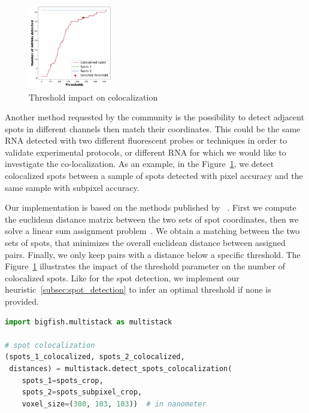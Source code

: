 \begin{figure}
	\begin{center}
		\includegraphics[width=0.33\textwidth]{figures/chapter2/colocalization_elbow}
	\caption{Threshold impact on colocalization}
	\label{fig:elbow_colocalization}
	\end{center}
\end{figure}

Another method requested by the community is the possibility to detect adjacent spots in different channels then match their coordinates.
This could be the same \ac{RNA} detected with two different fluorescent probes or techniques in order to validate experimental protocols, or different \ac{RNA} for which we would like to investigate the co-localization. 
As an example, in the Figure~\ref{fig:elbow_colocalization}, we detect colocalized spots between a sample of spots detected with pixel accuracy and the same sample with subpixel accuracy.

Our implementation is based on the methods published by ~\cite{CORNES_2022}.
First we compute the euclidean distance matrix between the two sets of spot coordinates, then we solve a linear sum assignment problem~\cite{crouse_linear_assignment_2016, 2020SciPy-NMeth}.
We obtain a matching between the two sets of spots, that minimizes the overall euclidean distance between assigned pairs.
Finally, we only keep pairs with a distance below a specific threshold.
The Figure~\ref{fig:elbow_colocalization} illustrates the impact of the threshold parameter on the number of colocalized spots.
Like for the spot detection, we implement our heuristic~\ref{subsec:spot_detection} to infer an optimal threshold if none is provided.\\

\begin{minipage}{0.9\textwidth}
\begin{lstlisting}[language=Python]
import bigfish.multistack as multistack

# spot colocalization
(spots_1_colocalized, spots_2_colocalized,
 distances) = multistack.detect_spots_colocalization(
	spots_1=spots_crop,
	spots_2=spots_subpixel_crop,
	voxel_size=(300, 103, 103))  # in nanometer
\end{lstlisting}
\end{minipage}

